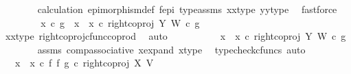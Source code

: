 \begin{isabellebody}
\ \ \ \ \ \ \isamarkupfalse%
\ calculation\ epimorphism{\isacharunderscore}{\kern0pt}def{}\ f{\isacharunderscore}{\kern0pt}epi\ type{\isacharunderscore}{\kern0pt}assms{\isacharparenleft}{\kern0pt}{}{\isacharparenright}{\kern0pt}\ x{}{\isacharunderscore}{\kern0pt}x{}{\isacharunderscore}{\kern0pt}type{\isacharparenleft}{\kern0pt}{}{\isacharparenright}{\kern0pt}\ y{}{\isacharunderscore}{\kern0pt}y{}{\isacharunderscore}{\kern0pt}type{\isacharparenleft}{\kern0pt}{}{\isacharparenright}{\kern0pt}\ \isamarkupfalse%
\ fastforce\isanewline
\ \ \isamarkupfalse%
\isanewline
\ \ \ \ \isamarkupfalse%
\ {\isachardoublequoteopen}x{}\ {\isasymcirc}\isactrlsub c\ g\ {\isacharequal}{\kern0pt}\ {\isacharparenleft}{\kern0pt}{\isacharparenleft}{\kern0pt}x{}\ {\isasymamalg}\ x{}{\isacharparenright}{\kern0pt}\ {\isasymcirc}\isactrlsub c\ right{\isacharunderscore}{\kern0pt}coproj\ Y\ W{\isacharparenright}{\kern0pt}\ {\isasymcirc}\isactrlsub c\ g{\isachardoublequoteclose}\isanewline
\ \ \ \ \ \ \isamarkupfalse%
\ x{}{\isacharunderscore}{\kern0pt}x{}{\isacharunderscore}{\kern0pt}type\ right{\isacharunderscore}{\kern0pt}coproj{\isacharunderscore}{\kern0pt}cfunc{\isacharunderscore}{\kern0pt}coprod\ \isamarkupfalse%
\ auto\ \isanewline
\ \ \ \ \isamarkupfalse%
\ \isamarkupfalse%
\ {\isachardoublequoteopen}{\isachardot}{\kern0pt}{\isachardot}{\kern0pt}{\isachardot}{\kern0pt}\ {\isacharequal}{\kern0pt}\ {\isacharparenleft}{\kern0pt}x{}\ {\isasymamalg}\ x{}{\isacharparenright}{\kern0pt}\ {\isasymcirc}\isactrlsub c\ right{\isacharunderscore}{\kern0pt}coproj\ Y\ W\ {\isasymcirc}\isactrlsub c\ g{\isachardoublequoteclose}\isanewline
\ \ \ \ \ \ \isamarkupfalse%
\ assms\ comp{\isacharunderscore}{\kern0pt}associative{}\ x{\isacharunderscore}{\kern0pt}expand\ x{\isacharunderscore}{\kern0pt}type\ \isamarkupfalse%
\ {\isacharparenleft}{\kern0pt}typecheck{\isacharunderscore}{\kern0pt}cfuncs{\isacharcomma}{\kern0pt}\ auto{\isacharparenright}{\kern0pt}\isanewline
\ \ \ \ \isamarkupfalse%
\ \isamarkupfalse%
\ {\isachardoublequoteopen}{\isachardot}{\kern0pt}{\isachardot}{\kern0pt}{\isachardot}{\kern0pt}\ {\isacharequal}{\kern0pt}\ {\isacharparenleft}{\kern0pt}x{}\ {\isasymamalg}\ x{}{\isacharparenright}{\kern0pt}\ {\isasymcirc}\isactrlsub c\ {\isacharparenleft}{\kern0pt}f\ {\isasymbowtie}\isactrlsub f\ g{\isacharparenright}{\kern0pt}\ {\isasymcirc}\isactrlsub c\ right{\isacharunderscore}{\kern0pt}coproj\ X\ V{\isachardoublequoteclose}\isanewline

\end{isabellebody}
